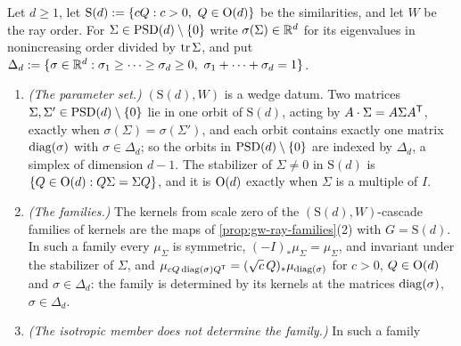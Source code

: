 \begin{proposition}
\label{prop:similarity-ray-families}
\leanok
Let $d \ge 1$, let $\mathrm S(d) := \{cQ : c > 0,\ Q \in \mathrm{O}(d)\}$ be the similarities, and let $W$ be
the ray order. For $\Sigma \in \mathrm{PSD}(d) \setminus \{0\}$ write $\sigma(\Sigma) \in \mathbb{R}^d$ for its
eigenvalues in nonincreasing order divided by $\operatorname{tr}\Sigma$, and put
$\Delta_d := \{\sigma \in \mathbb{R}^d : \sigma_1 \ge \dots \ge \sigma_d \ge 0,\ \sigma_1 + \dots + \sigma_d = 1\}$.
\begin{enumerate}
\item \emph{(The parameter set.)} $(\mathrm S(d), W)$ is a wedge datum. Two matrices
$\Sigma, \Sigma' \in \mathrm{PSD}(d) \setminus \{0\}$ lie in one orbit of $\mathrm S(d)$, acting by
$A\cdot\Sigma = A\Sigma A^{\mathsf{T}}$, exactly when $\sigma(\Sigma) = \sigma(\Sigma')$, and each orbit contains
exactly one matrix $\operatorname{diag}(\sigma)$ with $\sigma \in \Delta_d$; so the orbits in $\mathrm{PSD}(d) \setminus \{0\}$
are indexed by $\Delta_d$, a simplex of dimension $d - 1$. The stabilizer of $\Sigma \ne 0$ in
$\mathrm S(d)$ is $\{Q \in \mathrm{O}(d) : Q\Sigma = \Sigma Q\}$, and it is $\mathrm{O}(d)$ exactly when $\Sigma$ is
a multiple of $I$.
\item \emph{(The families.)} The kernels from scale zero of the $(\mathrm S(d), W)$-cascade families of
kernels are the maps of \ref{prop:gw-ray-families}(2) with $G = \mathrm S(d)$. In such a family every
$\mu_\Sigma$ is symmetric, $(-I)_*\mu_\Sigma = \mu_\Sigma$, and invariant under the stabilizer of
$\Sigma$, and $\mu_{cQ\operatorname{diag}(\sigma)Q^{\mathsf{T}}} = (\sqrt c\,Q)_*\mu_{\operatorname{diag}(\sigma)}$ for $c > 0$, $Q \in \mathrm{O}(d)$
and $\sigma \in \Delta_d$: the family is determined by its kernels at the matrices $\operatorname{diag}(\sigma)$,
$\sigma \in \Delta_d$.
\item \emph{(The isotropic member does not determine the family.)} In such a family

\end{enumerate}
\end{proposition}
